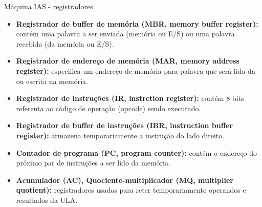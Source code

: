 \begin{slide}[toc=]{Máquina IAS - registradores}
\begin{itemize}
	\item \textbf{Registrador de buffer de memória (MBR, memory buffer register):} contém uma palavra a ser enviada (memória ou E/S) ou uma palavra recebida (da memória ou E/S).
	\item \textbf{Registrador de endereço de memória (MAR, memory address register):} especifica um endereço de memória para palavra que será lida da ou escrita na memória.
	\item \textbf{Registrador de instruções (IR, instrction register):} contém 8 bits referenta ao código de operação (opcode) sendo executado.
	\item \textbf{Registrador de buffer de instruções (IBR, instruction buffer register):} armazena temporariamente a instrução do lado direito.
	\item \textbf{Contador de programa (PC, program counter):} contém o endereço do próximo par de instruções a ser lido da memória.
	\item \textbf{Acumulador (AC), Quociente-multiplicador (MQ, multiplier quotient):} registradores usados para reter temporariamente operandos e resultados da ULA.
\end{itemize}
\end{slide}


